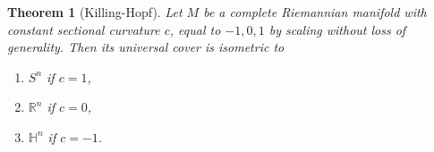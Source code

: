 \documentclass{book}
\newcommand{\bbH}{\mathbb{H}}
\newcommand{\bbR}{\mathbb{R}}
\newtheorem{theorem}{Theorem}[section]
\theoremstyle{definition}
\numberwithin{equation}{section}
\begin{document}
\begin{theorem}[Killing-Hopf]
    Let $M$ be a complete Riemannian manifold with constant sectional curvature $c$, equal to $-1,0,1$ by scaling without loss of generality. Then its universal cover is isometric to
    \begin{enumerate}[label={\rm (\roman*)}]
        \item $S^n$ if $c = 1$,
        \item $\bbR^n$ if $c = 0$,
        \item $\bbH^n$ if $c = -1$.
    \end{enumerate}
\end{theorem}
\end{document}
